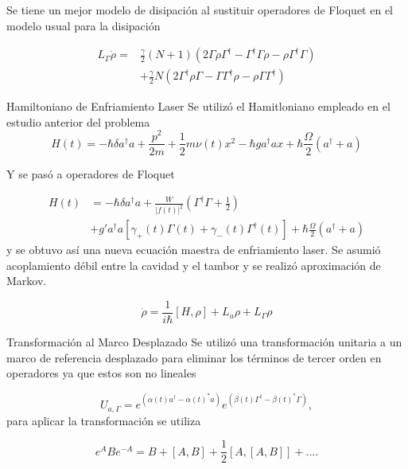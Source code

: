 \documentclass[10pt]{beamer}
\begin{document}
\begin{frame}
Se tiene un mejor modelo de disipación al sustituir operadores de Floquet en el modelo usual para la disipación

\begin{align*} 
L_\Gamma \dot{\rho}=&\frac{\gamma}{2}(N+1)(2\Gamma\rho\Gamma^\dagger - \Gamma^\dagger\Gamma \rho - \rho \Gamma^\dagger \Gamma )\\
 &+ \frac{\gamma}{2}N(2\Gamma^\dagger \rho \Gamma - \Gamma \Gamma^\dagger \rho - \rho \Gamma\Gamma^\dagger)
\end{align*}
\end{frame}


\begin{frame}{Hamiltoniano de Enfriamiento Laser}
Se utilizó el Hamitloniano empleado en el estudio anterior del problema
\begin{equation*}
H(t) = -\hbar \delta a^\dagger a + \frac{p^2}{2m} + \frac{1}{2}m \nu (t) x^2 -\hbar g a^\dagger a x + \hbar\frac{\Omega}{2}(a^\dagger + a)
\end{equation*}

Y se pasó a operadores de Floquet

\end{frame}

\begin{frame}
\begin{align*}
H(t) &= -\hbar \delta a^\dagger a + \frac{W}{|f(t)|^2}(\Gamma^\dagger \Gamma + \frac{1}{2}) \\
&+  g'a^\dagger a[\gamma_+(t)\Gamma (t) +\gamma_-(t)\Gamma^\dagger (t)] + \hbar\frac{\Omega}{2}(a^\dagger + a)
\end{align*} y se obtuvo así una nueva ecuación maestra de enfriamiento laser. Se asumió acoplamiento débil entre la cavidad y el tambor y se realizó aproximación de Markov.

\begin{equation*}
\dot{\rho} = \frac{1}{i\hbar}[H,\rho] + L_a\rho + L_\Gamma \rho
\end{equation*}
\end{frame}

\begin{frame}{Transformación al Marco Desplazado}
Se utilizó una transformación unitaria a un marco de referencia desplazado para eliminar los términos de tercer orden en operadores ya que estos son no lineales

\begin{equation*}
U_{a,\Gamma} = e^{(\alpha(t) a^\dagger - \alpha(t)^*a)}e^{(\beta(t) \Gamma^\dagger - \beta(t)^*\Gamma)},
\end{equation*} para aplicar la transformación se utiliza

\begin{equation*}
e^{A} B e^{-A} = B + [A,B] + \frac{1}{2}[A,[A,B]] + ... .
\end{equation*}
\end{frame}
\end{document}

